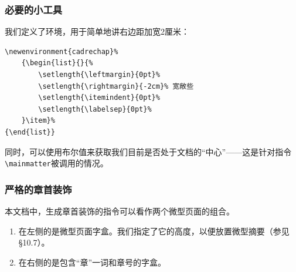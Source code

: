 \subsubsection{必要的小工具}

我们定义了环境，用于简单地讲右边距加宽2厘米：

\begin{dmd}
\begin{verbatim}
\newenvironment{cadrechap}% 
    {\begin{list}{}{%
        \setlength{\leftmargin}{0pt}% 
        \setlength{\rightmargin}{-2cm}% 宽敞些
        \setlength{\itemindent}{0pt}% 
        \setlength{\labelsep}{0pt}%
    }\item}% 
{\end{list}}\end{verbatim}
\end{dmd}

同时，可以使用布尔值来获取我们目前是否处于文档的``中心''——这是针对指令\verb|\mainmatter|被调用的情况。

\subsubsection{严格的章首装饰}

本文档中，生成章首装饰的指令可以看作两个微型页面的组合。%

\begin{enumerate}
    \item 在左侧的是微型页面字盒。我们指定了它的高度，以便放置微型摘要（参见\S 10.7）。
    \item 在右侧的是包含``章''一词和章号的字盒。
\end{enumerate}

\newcommand{\boite}[1]{%
  {\setlength{\fboxrule}{.2pt}%
    \setlength{\fboxsep}{-\fboxrule}%
    \fbox{#1}}}

\newcommand{\fairechapitre}[1]{%
  \noindent\begin{minipage}{\linewidth}%
      \boite{\begin{minipage}[t][3cm][c]{.75\textwidth}%
          \centering%
          为\\微型摘要\\准备的\\微型页面
        \end{minipage}}%
      \boite{\begin{minipage}[t]{.25\textwidth}
          \begin{flushright}
            {\fnomfont\chaptername}\\[.5cm]
            {\fnumfont\thechapter}
          \end{flushright}
        \end{minipage}}
    \end{minipage}\par
  \begin{flushright}\ftitrefont#1\end{flushright}}

